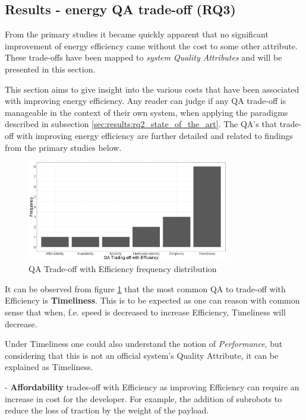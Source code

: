 \subsection{Results - energy QA trade-off (RQ3)}
\label{sec:results:rq3_trade_off}
From the primary studies it became quickly apparent that no significant improvement of energy efficiency came without the cost
to some other attribute. These trade-offs have been mapped to 
\textit{system Quality Attributes\cite{iso2011quality_attributes}} and will be presented
in this section.

This section aims to give insight into the various costs that have been associated with improving energy efficiency.
Any reader can judge if any QA trade-off is manageable in the context of their own system, when applying the paradigms
described in subsection \ref{sec:results:rq2_state_of_the_art}. 
The QA's that trade-off with improving energy efficiency are further detailed and related to findings from the primary studies below.

\begin{figure}
    \includegraphics[width=250pt]{figures/trade_off_freq.png}
    \caption{QA Trade-off with Efficiency frequency distribution}
    \label{fig:trade_off_freq}
\end{figure}

\vspace{5mm}

It can be observed from figure \ref{fig:trade_off_freq} that the most common QA to trade-off with Efficiency is \textbf{Timeliness}.
This is to be expected as one can reason with common sense that when, f.e. speed is decreased to increase Efficiency, Timeliness will decrease.

Under Timeliness one could also understand the notion of \textit{Performance}, but considering that this is not an official
system's Quality Attribute, it can be explained as Timeliness.

- \textbf{Affordability} trades-off with Efficiency as improving Efficiency can require an increase in cost for the developer.
For example, the addition of subrobots to reduce the loss of traction by the weight of the payload.

